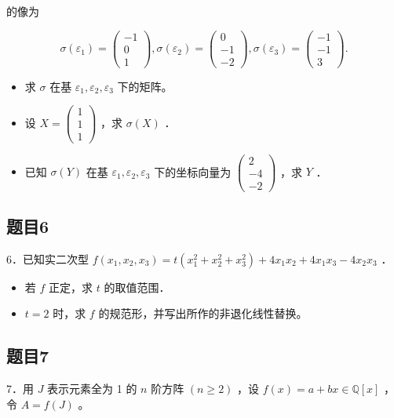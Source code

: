 \documentclass{article}
\begin{document}
的像为

\[
\sigma\left(\varepsilon_{1}\right)=\left(\begin{array}{c}
-1 \\
0 \\
1
\end{array}\right), \sigma\left(\varepsilon_{2}\right)=\left(\begin{array}{c}
0 \\
-1 \\
-2
\end{array}\right), \sigma\left(\varepsilon_{3}\right)=\left(\begin{array}{c}
-1 \\
-1 \\
3
\end{array}\right) .
\]

\begin{itemize}
  \item[（1）] 求 \(\sigma\) 在基 \(\varepsilon_{1}, \varepsilon_{2}, \varepsilon_{3}\) 下的矩阵。
  \item[（2）] 设 \(X=\left(\begin{array}{l}1 \\ 1 \\ 1\end{array}\right)\) ，求 \(\sigma(X)\) ．
  \item[（3）] 已知 \(\sigma(Y)\) 在基 \(\varepsilon_{1}, \varepsilon_{2}, \varepsilon_{3}\) 下的坐标向量为 \(\left(\begin{array}{c}2 \\ -4 \\ -2\end{array}\right)\) ，求 \(Y\) ．
\end{itemize}

\subsection{题目6}
6．已知实二次型 \(f\left(x_{1}, x_{2}, x_{3}\right)=t\left(x_{1}^{2}+x_{2}^{2}+x_{3}^{2}\right)+4 x_{1} x_{2}+4 x_{1} x_{3}-4 x_{2} x_{3}\) ．

\begin{itemize}
  \item[（1）] 若 \(f\) 正定，求 \(t\) 的取值范围．
  \item[（2）] \(t=2\) 时，求 \(f\) 的规范形，并写出所作的非退化线性替换。
\end{itemize}

\subsection{题目7}
7．用 \(J\) 表示元素全为 1 的 \(n\) 阶方阵 \((n \geq 2)\) ，设 \(f(x)=a+b x \in \mathbb{Q}[x]\) ，令 \(A=f(J)\) 。
\end{document}
